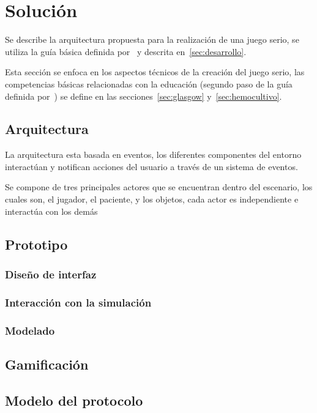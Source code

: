 
\section{Solución}
\label{sec:solucion}

Se describe la arquitectura propuesta para la realización de una juego serio, se
utiliza la guía básica definida por~\cite{pereira2009design} y descrita
en~\ref{sec:desarrollo}.

Esta sección se enfoca en los aspectos técnicos de la creación del juego serio,
las competencias básicas relacionadas con la educación (segundo paso de la guía
definida por~\cite{pereira2009design}) se define en las
secciones~\ref{sec:glasgow} y~\ref{sec:hemocultivo}.

\subsection{Arquitectura}

La arquitectura esta basada en eventos, los diferentes componentes del entorno
interactúan y notifican acciones del usuario a través de un sistema de eventos.

Se compone de tres principales actores que se encuentran dentro del
escenario, los cuales son, el jugador, el paciente, y los objetos, cada actor es
independiente e interactúa con los demás 

\subsection{Prototipo}
\subsubsection{Diseño de interfaz}
\subsubsection{Interacción con la simulación}
\subsubsection{Modelado}
\subsection{Gamificación}

\subsection{Modelo del protocolo}
